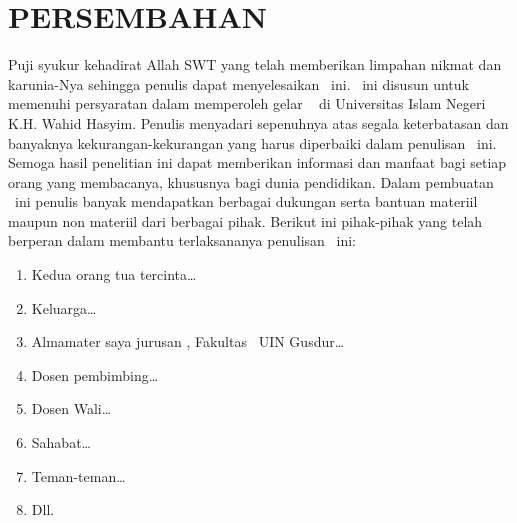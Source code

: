 
\chapter*{PERSEMBAHAN}

Puji syukur kehadirat Allah SWT yang telah memberikan limpahan nikmat dan karunia-Nya
sehingga penulis dapat menyelesaikan \type~ini. \Type~ini disusun untuk memenuhi persyaratan
dalam memperoleh gelar \gelar~ di Universitas Islam Negeri K.H. Wahid Hasyim.
Penulis menyadari sepenuhnya atas segala keterbatasan dan banyaknya kekurangan-kekurangan
yang harus diperbaiki dalam penulisan \type~ini.
Semoga hasil penelitian ini dapat memberikan informasi dan manfaat bagi setiap orang
yang membacanya, khususnya bagi dunia pendidikan.
Dalam pembuatan \type~ini penulis banyak mendapatkan berbagai dukungan serta bantuan materiil
maupun non materiil dari berbagai pihak.
Berikut ini pihak-pihak yang telah berperan dalam membantu terlaksananya penulisan \type~ini:

\begin{enumerate}
 \item{Kedua orang tua tercinta\ldots}
 \item{Keluarga\ldots}
 \item{Almamater saya jurusan \program, Fakultas \fakultas~UIN Gusdur\ldots}
 \item{Dosen pembimbing\ldots}
 \item{Dosen Wali\ldots}
 \item{Sahabat\ldots}
 \item{Teman-teman\ldots}
 \item{Dll.}
\end{enumerate}


\newpage

